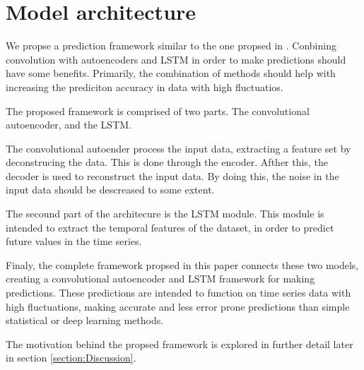 \section{Model architecture}
\label{section:Architecture:Model}


We propse a prediction framework similar to the one propsed in \cite{Zhao2019}.
Conbining convolution with autoencoders and LSTM in order to make predictions should have some benefits.
Primarily, the combination of methods should help with increasing the prediciton accuracy in data with high fluctuatios.

The proposed framework is comprised of two parts.
The convolutional autoencoder, and the LSTM.


The convolutional autoender process the input data, extracting a feature set by deconstrucing the data.
This is done through the encoder. Afther this, the decoder is used to reconstruct the input data.
By doing this, the noise in the input data should be descreased to some extent.

The secound part of the architecure is the LSTM module.
This module is intended to extract the temporal features of the dataset,
in order to predict future values in the time series.


Finaly, the complete framework propsed in this paper connects these two models,
creating a convolutional autoencoder and LSTM framework for making predictions.
These predictions are intended to function on time series data with high fluctuations,
making accurate and less error prone predictions than simple statistical or deep learning methods.

The motivation behind the propsed framework is explored in further detail later in section \ref{section:Discussion}.

